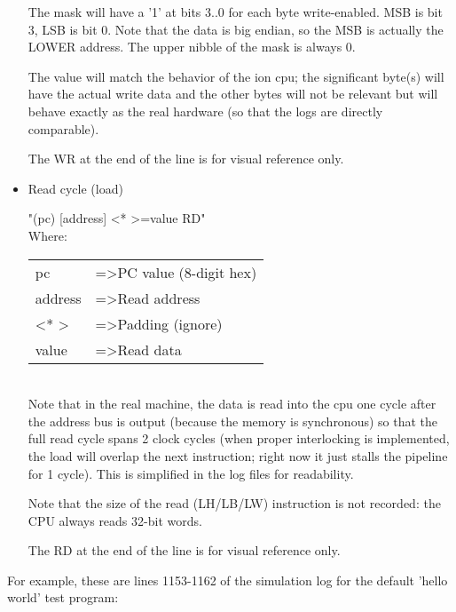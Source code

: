 \begin{itemize}
        The mask will have a '1' at bits 3..0 for each byte write-enabled. MSB
        is bit 3, LSB is bit 0. Note that the data is big endian, so the MSB
        is actually the LOWER address. The upper nibble of the mask is always 0.

        The value will match the behavior of the ion cpu; the significant
        byte(s) will have the actual write data and the other bytes will not
        be relevant but will behave exactly as the real hardware (so that the
        logs are directly comparable).

        The WR at the end of the line is for visual reference only.

    \item Read cycle (load)

        "(pc) [address] \textless ** \textgreater =value RD"\\

        Where:
        
        \begin{tabular}{ l l }
        pc      & =\textgreater PC value (8-digit hex)\\
        address & =\textgreater Read address\\
        \textless ** \textgreater    & =\textgreater Padding (ignore)\\
        value   & =\textgreater Read data\\
        \end{tabular}\\

        Note that in the real machine, the data is read into the cpu one cycle
        after the address bus is output (because the memory is synchronous) so
        that the full read cycle spans 2 clock cycles (when proper interlocking
        is implemented, the load will overlap the next instruction; right now
        it just stalls the pipeline for 1 cycle). This is simplified in the log
        files for readability.

        Note that the size of the read (LH/LB/LW) instruction is not recorded:
        the CPU always reads 32-bit words.

        The RD at the end of the line is for visual reference only.

    \end{itemize}
       

    For example, these are lines 1153-1162 of the simulation log for the
    default 'hello world' test program:

